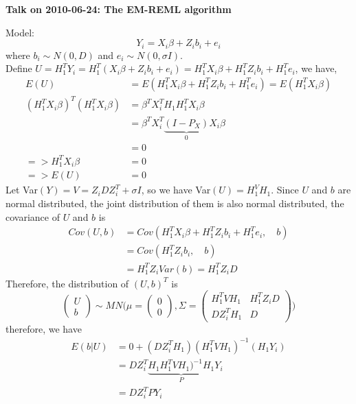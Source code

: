 \documentclass[12pt]{article}
\begin{document}
    \begin{center}
        {\bf Talk on 2010-06-24: The EM-REML algorithm}
    \end{center}
    Model:
    \begin{equation*}
        Y_i=X_i\beta+Z_ib_i+e_i
    \end{equation*}
    where $b_i\sim N(0,D)$ and $e_i\sim N(0,\sigma I)$.\\
    Define $U=H_1^TY_i=H_1^T(X_i\beta+Z_ib_i+e_i)=H_1^TX_i\beta+H_1^TZ_ib_i+H_1^Te_i$, we have,
    \begin{align*}
        E(U)&=E(H_1^TX_i\beta+H_1^TZ_ib_i+H_1^Te_i)=E(H_1^TX_i\beta)\\
        (H_1^TX_i\beta)^T(H_1^TX_i\beta)&=\beta^TX_i^TH_1H_1^TX_i\beta\\
        &=\beta^TX_i^T\underbrace{(I-P_X)}_{0}X_i\beta\\
        &=0\\
        => H_1^TX_i\beta&=0\\
        => E(U)&=0
    \end{align*}
    Let Var$(Y)=V=Z_iDZ_i^T+\sigma I$, so we have Var$(U)=H_1^VH_1$.
    Since $U$ and $b$ are normal distributed, the joint distribution of them is also normal distributed, the covariance of $U$ and $b$ is
     \begin{equation*}
     \begin{split}
        Cov(U,b)&=Cov(H_1^TX_i\beta+H_1^TZ_ib_i+H_1^Te_i,\quad b)\\
        &=Cov(H_1^TZ_ib_i,\quad b)\\
        &=H_1^TZ_iVar(b)=H_1^TZ_iD
     \end{split}
    \end{equation*}
    Therefore, the distribution of $(U,b)^T$ is
    \begin{equation*}
    \begin{pmatrix}
    U\\
    b
    \end{pmatrix}
    \sim MN\Big( \mu=\begin{pmatrix}
    0\\
    0
    \end{pmatrix}
    ,\Sigma=\begin{pmatrix}
    H_1^TVH_1&H_1^TZ_iD\\
    DZ_i^TH_1&D
    \end{pmatrix}
    \Big)
    \end{equation*}    
    therefore, we have
    \begin{equation}
    \begin{split}
        E(b|U)&=0+(DZ_i^TH_1)(H_1^TVH_1)^{-1}(H_1Y_i)\\
        &=DZ_i^T\underbrace{H_1H_1^TVH_1)^{-1}H_1}_{P}Y_i\\
        &=DZ_i^TPY_i
    \end{split}
    \end{equation}
\end{document}
